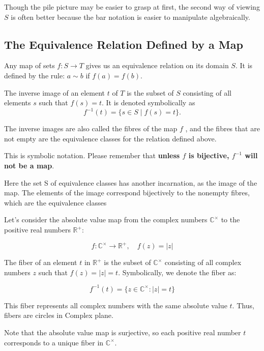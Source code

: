 \documentclass[
]{book}
\begin{document}
Though the pile picture may be easier to grasp at first, the second way
of viewing \(S\) is often better because the bar notation is easier to
manipulate algebraically.

\hypertarget{the-equivalence-relation-defined-by-a-map}{%
\subsection{The Equivalence Relation Defined by a
Map}\label{the-equivalence-relation-defined-by-a-map}}

Any map of sets \(f : S \to T\) gives us an equivalence relation on its
domain \(S\). It is defined by the rule: \(a \sim b\) if
\(f(a) = f(b)\).

\leavevmode{}%
The inverse image of an element \(t\) of \(T\) is the subset of \(S\)
consisting of all elements \(s\) such that \(f(s) = t\). It is denoted
symbolically as \begin{equation}
f^{-1}(t) = \{s \in S \mid f(s) = t\}.
\end{equation}

The inverse images are also called the fibres of the map \(f\) , and the
fibres that are not empty are the equivalence classes for the relation
defined above.

This is symbolic notation. Please remember that \textbf{unless \(f\) is
bijective, \(f^{-1}\) will not be a map}.

Here the set S of equivalence classes has another incarnation, as the
image of the map. The elements of the image correspond bijectively to
the nonempty fibres, which are the equivalence classes

\leavevmode{}%
Let's consider the absolute value map from the complex numbers
\(\mathbb{C}^\times\) to the positive real numbers \(\mathbb{R}^+\):

\[ f: \mathbb{C}^\times \to \mathbb{R}^+, \quad f(z) = |z| \]

The fiber of an element \(t\) in \(\mathbb{R}^+\) is the subset of
\(\mathbb{C}^\times\) consisting of all complex numbers \(z\) such that
\(f(z) = |z| = t\). Symbolically, we denote the fiber as:

\[ f^{-1}(t) = \{ z \in \mathbb{C}^\times : |z| = t \} \]

This fiber represents all complex numbers with the same absolute value
\(t\). Thus, fibers are circles in Complex plane.

Note that the absolute value map is surjective, so each positive real
number \(t\) corresponds to a unique fiber in \(\mathbb{C}^\times\).
\end{document}

